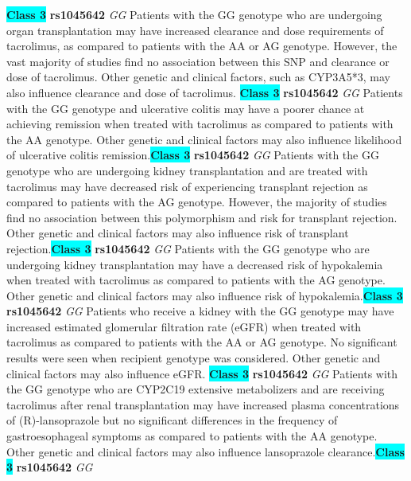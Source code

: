 \documentclass{report}
\begin{document}
\textbf{\colorbox{cyan} {Class 3}} \textbf{ rs1045642 } \textit{ GG }
Patients with the GG genotype who are undergoing organ transplantation may have increased clearance and dose requirements of tacrolimus, as compared to patients with the AA or AG genotype. However, the vast majority of studies find no association between this SNP and clearance or dose of tacrolimus. Other genetic and clinical factors, such as CYP3A5*3, may also influence clearance and dose of tacrolimus. \newline\textbf{\colorbox{cyan} {Class 3}} \textbf{ rs1045642 } \textit{ GG }
Patients with the GG genotype and ulcerative colitis may have a poorer chance at achieving remission when treated with tacrolimus as compared to patients with the AA genotype. Other genetic and clinical factors may also influence likelihood of ulcerative colitis remission.\newline\textbf{\colorbox{cyan} {Class 3}} \textbf{ rs1045642 } \textit{ GG }
Patients with the GG genotype who are undergoing kidney transplantation and are treated with tacrolimus may have decreased risk of experiencing transplant rejection as compared to patients with the AG genotype. However, the majority of studies find no association between this polymorphism and risk for transplant rejection. Other genetic and clinical factors may also influence risk of transplant rejection.\newline\textbf{\colorbox{cyan} {Class 3}} \textbf{ rs1045642 } \textit{ GG }
Patients with the GG genotype who are undergoing kidney transplantation may have a decreased risk of hypokalemia when treated with tacrolimus as compared to patients with the AG genotype. Other genetic and clinical factors may also influence risk of hypokalemia.\newline\textbf{\colorbox{cyan} {Class 3}} \textbf{ rs1045642 } \textit{ GG }
Patients who receive a kidney with the GG genotype may have increased estimated glomerular filtration rate (eGFR) when treated with tacrolimus as compared to patients with the AA or AG genotype. No significant results were seen when recipient genotype was considered. Other genetic and clinical factors may also influence eGFR. \newline\textbf{\colorbox{cyan} {Class 3}} \textbf{ rs1045642 } \textit{ GG }
Patients with the GG genotype who are CYP2C19 extensive metabolizers and are receiving tacrolimus after renal transplantation may have increased plasma concentrations of (R)-lansoprazole but no significant differences in the frequency of gastroesophageal symptoms as compared to patients with the AA genotype. Other genetic and clinical factors may also influence lansoprazole clearance.\newline\textbf{\colorbox{cyan} {Class 3}} \textbf{ rs1045642 } \textit{ GG }
\end{document}

